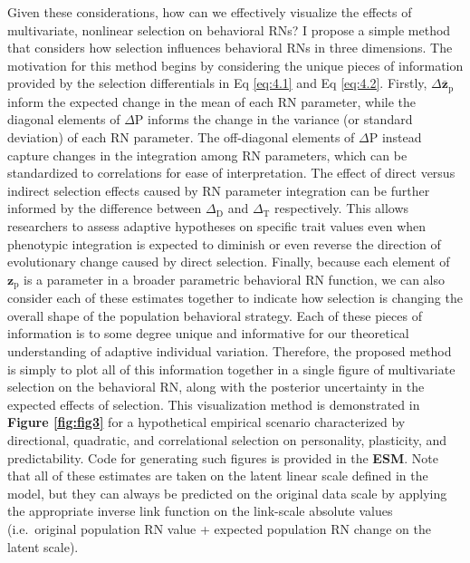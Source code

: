 \documentclass{article}
\begin{document}
Given these considerations, how can we effectively visualize the effects
of multivariate, nonlinear selection on behavioral RNs? I propose a
simple method that considers how selection influences behavioral RNs in
three dimensions. The motivation for this method begins by considering
the unique pieces of information provided by the selection differentials
in Eq \ref{eq:4.1} and Eq \ref{eq:4.2}. Firstly,
\(\Delta \bar{\boldsymbol{z}}_{\boldsymbol{\mathrm{p}}}\) inform the
expected change in the mean of each RN parameter, while the diagonal
elements of \(\Delta \boldsymbol{\mathrm{P}}\) informs the change in the
variance (or standard deviation) of each RN parameter. The off-diagonal
elements of \(\Delta \boldsymbol{\mathrm{P}}\) instead capture changes
in the integration among RN parameters, which can be standardized to
correlations for ease of interpretation. The effect of direct versus
indirect selection effects caused by RN parameter integration can be
further informed by the difference between \(\Delta_{\mathrm{D}}\) and
\(\Delta_{\mathrm{T}}\) respectively. This allows researchers to assess
adaptive hypotheses on specific trait values even when phenotypic
integration is expected to diminish or even reverse the direction of
evolutionary change caused by direct selection. Finally, because each
element of \(\boldsymbol{z}_{\boldsymbol{\mathrm{p}}}\) is a parameter
in a broader parametric behavioral RN function, we can also consider
each of these estimates together to indicate how selection is changing
the overall shape of the population behavioral strategy. Each of these
pieces of information is to some degree unique and informative for our
theoretical understanding of adaptive individual variation. Therefore,
the proposed method is simply to plot all of this information together
in a single figure of multivariate selection on the behavioral RN, along
with the posterior uncertainty in the expected effects of selection.
This visualization method is demonstrated in \textbf{Figure
\ref{fig:fig3}} for a hypothetical empirical scenario characterized by
directional, quadratic, and correlational selection on personality,
plasticity, and predictability. Code for generating such figures is
provided in the \textbf{ESM}. Note that all of these estimates are taken
on the latent linear scale defined in the model, but they can always be
predicted on the original data scale by applying the appropriate inverse
link function on the link-scale absolute values (i.e.~original
population RN value + expected population RN change on the latent
scale).
\end{document}
